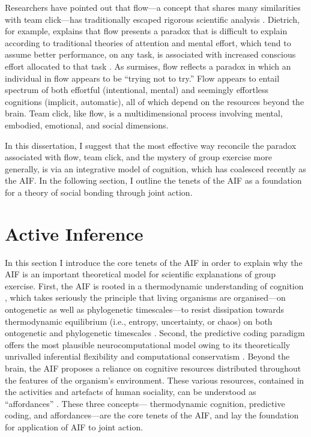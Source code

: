 \begin{CJK}{UTF8}{gbsn}
Researchers have pointed out that flow---a concept that shares many similarities with team click---has traditionally escaped rigorous scientific analysis \citep{Dietrich2010a,Slingerland2014}.  Dietrich, for example, explains that flow presents a paradox that is difficult to explain according to traditional theories of attention and mental effort, which tend to assume better performance, on any task, is associated with increased conscious effort allocated to that task \citep{Dietrich2004b}.  As \textcite{Slingerland2014} surmises, flow reflects a paradox in which an individual in flow appears to be ``trying not to try.''  Flow appears to entail spectrum of both effortful (intentional, mental) and seemingly effortless cognitions (implicit, automatic), all of which depend on the resources beyond the brain.  Team click, like flow, is a multidimensional process involving mental, embodied, emotional, and social dimensions.

In this dissertation, I suggest that the most effective way reconcile the paradox associated with flow, team click, and the mystery of group exercise more generally, is via an integrative model of cognition, which has coalesced recently as the AIF. In the following section, I outline the tenets of the AIF as a foundation for a theory of social bonding through joint action.



\section{Active Inference \label{sect:activeIn}}
In this section I introduce the core tenets of the AIF in order to explain why the AIF is an important theoretical model for scientific explanations of group exercise.  First, the AIF is rooted in a thermodynamic understanding of cognition \citep{Yufik2017}, which takes seriously the principle that living organisms are organised---on ontogenetic as well as phylogenetic timescales---to resist dissipation towards thermodynamic equilibrium (i.e., entropy, uncertainty, or chaos) on both ontogenetic and phylogenetic timescales \citep[see][]{Friston2010,Yufik2002,Sengupta2016,Linson2018}. Second,  the predictive coding paradigm \citep[cf.][]{Rao1999,Clark2013} offers the most plausible neurocomputational model owing to its theoretically unrivalled inferential flexibility and computational conservatism \citep{Friston2006}.  Beyond the brain, the AIF proposes a reliance on cognitive resources distributed throughout the features of the organism's environment. These various resources, contained in the activities and artefacts of human sociality, can be understood as ``affordances'' \citep{Gibson1979,Ramstead2016,Bruineberg2014}. These three concepts--- thermodynamic cognition, predictive coding, and affordances---are the core tenets of the AIF, and lay the foundation for application of AIF to joint action.


\end{CJK}
